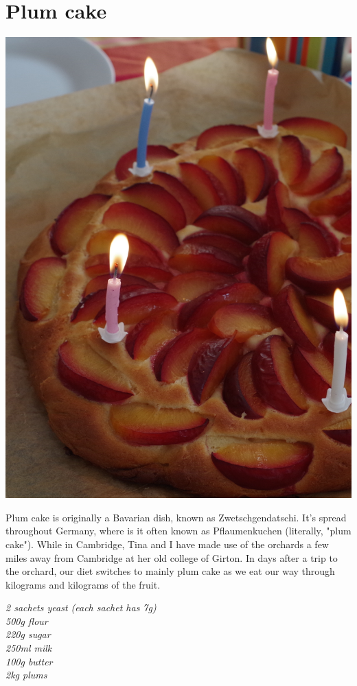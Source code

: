\documentclass{tufte-book}
\begin{document}
\section{Plum cake}

\begin{marginfigure}%
  \includegraphics[width=\linewidth]{plumcake.png}
\end{marginfigure}

Plum cake is originally a Bavarian dish, known as Zwetschgendatschi. It's spread throughout Germany, where is it often known as Pflaumenkuchen (literally, "plum cake"). While in Cambridge, Tina and I have made use of the orchards a few miles away from Cambridge at her old college of Girton. In days after a trip to the orchard, our diet switches to mainly plum cake as we eat our way through kilograms and kilograms of the fruit.

\smallskip
\emph{2 sachets yeast (each sachet has 7g)
\\500g flour
\\220g sugar
\\250ml milk
\\100g butter
\\2kg plums
}
\end{document}
